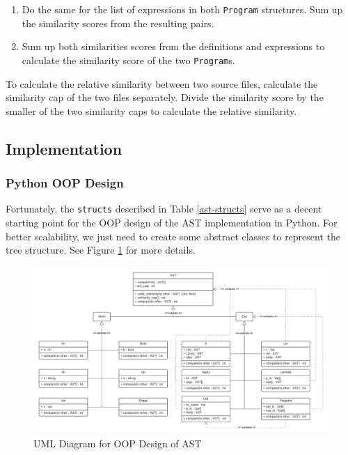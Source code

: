 \documentclass[12pt]{article}
\newcommand{\key}[1]{\texttt{#1}}
\begin{document}
\begin{itemize}
\begin{adjustwidth}{5mm}{}
\begin{enumerate}
\item     Do the same for the list of expressions in both \key{Program} structures. Sum up the similarity scores from the resulting pairs.

\item     Sum up both similarities scores from the definitions and expressions to calculate the similarity score of the two \key{Program}s.
  \end{enumerate}
    \end{adjustwidth}
  \end{itemize}

  To calculate the relative similarity between two source files, calculate the similarity cap of the two files separately. Divide the similarity score by the smaller of the two similarity caps to calculate the relative similarity.

\subsection{Implementation}
\subsubsection{Python OOP Design}
Fortunately, the \key{structs} described in Table \ref{ast-structs} serve as a decent starting point for the OOP design of the AST implementation in Python. For better scalability, we just need to create some abstract classes to represent the tree structure. See Figure \ref{oop-uml} for more details.
\begin{figure}[H]
  \begin{mdframed}
    \centering
    \includegraphics[scale=.45]{oop_uml}
  \end{mdframed}
  \caption{UML Diagram for OOP Design of AST}
  \label{oop-uml}
\end{figure}
\end{document}
